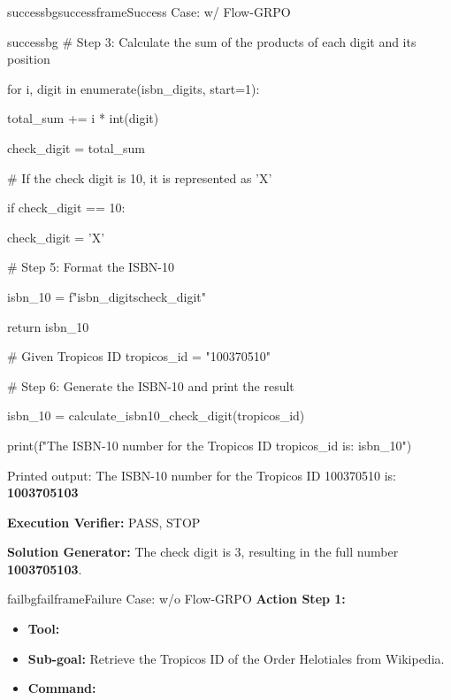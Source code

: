 \begin{small}
\begin{center}
\begin{casebox}{successbg}{successframe}{Success Case: \model w/ Flow-GRPO}
\begin{itemize}[nosep, leftmargin=*]
\begin{casecode}{successbg}
    \hspace{4mm}\# Step 3: Calculate the sum of the products of each digit and its position

    \hspace{4mm}for i, digit in enumerate(isbn\_digits, start=1):

    \hspace{8mm}total\_sum += i * int(digit)


    \hspace{4mm}check\_digit = total\_sum %


    \hspace{4mm}\# If the check digit is 10, it is represented as 'X'

    \hspace{4mm}if check\_digit == 10:

    \hspace{8mm}check\_digit = 'X'
    

    \hspace{4mm}\# Step 5: Format the ISBN-10

    \hspace{4mm}isbn\_10 = f"{isbn\_digits}{check\_digit}"

    \hspace{4mm}return isbn\_10


\# Given Tropicos ID
tropicos\_id = "100370510"

\# Step 6: Generate the ISBN-10 and print the result

isbn\_10 = calculate\_isbn10\_check\_digit(tropicos\_id)

print(f"The ISBN-10 number for the Tropicos ID {tropicos\_id} is: {isbn\_10}")
        \end{casecode}
        Printed output: The ISBN-10 number for the Tropicos ID 100370510 is: \textbf{1003705103}
    \end{itemize}

    \vspace{1em}

    \textbf{Execution Verifier:} \textcolor{successframe}{PASS, STOP}
    
    \vspace{1em}

    \textbf{Solution Generator: } \textcolor{successframe}{The check digit is 3, resulting in the full number \textbf{1003705103}.}

\end{casebox}

\begin{casebox}{failbg}{failframe}{Failure Case: \model w/o Flow-GRPO}
    \textbf{Action Step 1:}
    \begin{itemize}[nosep, leftmargin=*]
        \item \textbf{Tool:} 
        \item \textbf{Sub-goal:} Retrieve the Tropicos ID of the Order Helotiales from Wikipedia.
        \item \textbf{Command:}


\end{itemize}
\end{casebox}
\end{center}
\end{small}
